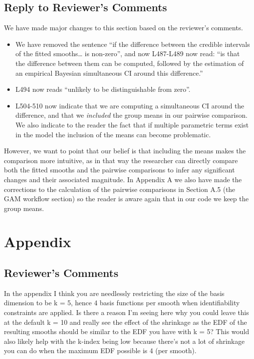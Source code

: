 \documentclass[
]{article}
\begin{document}
\hypertarget{section-9}{%
\subsection{\texorpdfstring{\textcolor{reviewersblue} {Reply to Reviewer's Comments}}{}}\label{section-9}}

We have made major changes to this section based on the reviewer's comments.

\begin{itemize}
\item
  We have removed the sentence ``if the difference between the credible intervals of the fitted smooths\ldots{} is non-zero'', and now L487-L489 now read: ``is that the difference between them can be computed, followed by the estimation of an empirical Bayesian simultaneous CI around this difference.''
\item
  L494 now reads ``unlikely to be distinguishable from zero''.
\item
  L504-510 now indicate that we are computing a simultaneous CI around the difference, and that we \emph{included} the group means in our pairwise comparison. We also indicate to the reader the fact that if multiple parametric terms exist in the model the inclusion of the means can become problematic.
\end{itemize}

However, we want to point that our belief is that including the means makes the comparison more intuitive, as in that way the researcher can directly compare both the fitted smooths and the pairwise comparisons to infer any significant changes and their associated magnitude. In Appendix A we also have made the corrections to the calculation of the pairwise comparisons in Section A.5 (the GAM workflow section) so the reader is aware again that in our code we keep the group means.

\hypertarget{appendix}{%
\section{Appendix}\label{appendix}}

\hypertarget{reviewers-comments-9}{%
\subsection{Reviewer's Comments}\label{reviewers-comments-9}}

In the appendix I think you are needlessly restricting the size of the basis dimension to be k = 5, hence 4 basis functions per smooth when identifiability constraints are applied. Is there a reason I'm seeing here why you could leave this at the default k = 10 and really see the effect of the shrinkage as the EDF of the resulting smooths should be similar to the EDF you have with k = 5? This would also likely help with the k-index being low because there's not a lot of shrinkage you can do when the maximum EDF possible is 4 (per smooth).
\end{document}
